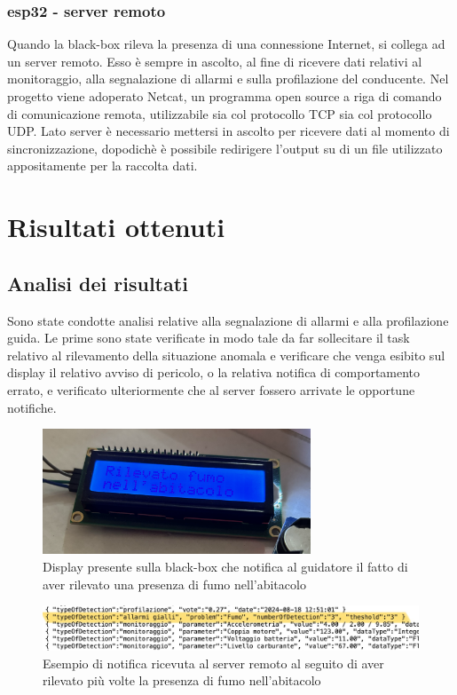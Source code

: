 \documentclass[12pt, a4paper, italian]{report}
\numberwithin{figure}{chapter}
\numberwithin{table}{chapter}
\begin{document}
\subsection{esp32 - server remoto}
Quando la black-box rileva la presenza di una connessione Internet, si collega ad un server remoto. Esso è sempre in ascolto, al fine di ricevere dati relativi al monitoraggio, alla segnalazione di allarmi e sulla profilazione del conducente. 
Nel progetto viene adoperato Netcat, un programma open source a riga di comando di comunicazione remota, utilizzabile sia col protocollo TCP sia col protocollo UDP. Lato server è necessario mettersi in ascolto per ricevere dati al momento di sincronizzazione, dopodichè è possibile redirigere l'output su di un file utilizzato appositamente per la raccolta dati. \cite{Netcat}

\chapter{Risultati ottenuti}
\section{Analisi dei risultati}
Sono state condotte analisi relative alla segnalazione di allarmi e alla profilazione guida. Le prime sono state verificate in modo tale da far sollecitare il task relativo al rilevamento della situazione anomala e verificare che venga esibito sul display il relativo avviso di pericolo, o la relativa notifica di comportamento errato, e verificato ulteriormente che al server fossero arrivate le opportune notifiche. 

\begin{figure}[h]
  \centering
  \includegraphics[width=8cm]{fumoLCD.png}
  \caption{Display presente sulla black-box che notifica al guidatore il fatto di aver rilevato una presenza di fumo nell'abitacolo}
  \label{fig:fumoLCD}
\end{figure}

\begin{figure}[h]
  \centering
  \includegraphics[width=14cm]{fumoServer.jpg}
  \caption{Esempio di notifica ricevuta al server remoto al seguito di aver rilevato più volte la presenza di fumo nell'abitacolo}
  \label{fig:fumoServer}
\end{figure}
\end{document}
